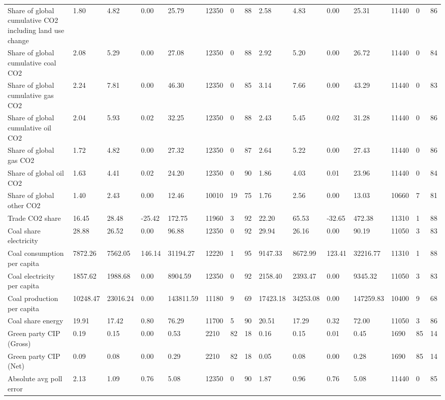 \begin{longtable}{lllllllllllllll}
Share of global cumulative CO2 including land use change & 1.80 & 4.82 & 0.00 & 25.79 & 12350 & 0 & 88 & 2.58 & 4.83 & 0.00 & 25.31 & 11440 & 0 & 86\\
Share of global cumulative coal CO2 & 2.08 & 5.29 & 0.00 & 27.08 & 12350 & 0 & 88 & 2.92 & 5.20 & 0.00 & 26.72 & 11440 & 0 & 84\\
Share of global cumulative gas CO2 & 2.24 & 7.81 & 0.00 & 46.30 & 12350 & 0 & 85 & 3.14 & 7.66 & 0.00 & 43.29 & 11440 & 0 & 83\\
Share of global cumulative oil CO2 & 2.04 & 5.93 & 0.02 & 32.25 & 12350 & 0 & 88 & 2.43 & 5.45 & 0.02 & 31.28 & 11440 & 0 & 86\\
\addlinespace
Share of global gas CO2 & 1.72 & 4.82 & 0.00 & 27.32 & 12350 & 0 & 87 & 2.64 & 5.22 & 0.00 & 27.43 & 11440 & 0 & 86\\
Share of global oil CO2 & 1.63 & 4.41 & 0.02 & 24.20 & 12350 & 0 & 90 & 1.86 & 4.03 & 0.01 & 23.96 & 11440 & 0 & 84\\
Share of global other CO2 & 1.40 & 2.43 & 0.00 & 12.46 & 10010 & 19 & 75 & 1.76 & 2.56 & 0.00 & 13.03 & 10660 & 7 & 81\\
Trade CO2 share & 16.45 & 28.48 & -25.42 & 172.75 & 11960 & 3 & 92 & 22.20 & 65.53 & -32.65 & 472.38 & 11310 & 1 & 88\\
Coal share electricity & 28.88 & 26.52 & 0.00 & 96.88 & 12350 & 0 & 92 & 29.94 & 26.16 & 0.00 & 90.19 & 11050 & 3 & 83\\
\addlinespace
Coal consumption per capita & 7872.26 & 7562.05 & 146.14 & 31194.27 & 12220 & 1 & 95 & 9147.33 & 8672.99 & 123.41 & 32216.77 & 11310 & 1 & 88\\
Coal electricity per capita & 1857.62 & 1988.68 & 0.00 & 8904.59 & 12350 & 0 & 92 & 2158.40 & 2393.47 & 0.00 & 9345.32 & 11050 & 3 & 83\\
Coal production per capita & 10248.47 & 23016.24 & 0.00 & 143811.59 & 11180 & 9 & 69 & 17423.18 & 34253.08 & 0.00 & 147259.83 & 10400 & 9 & 68\\
Coal share energy & 19.91 & 17.42 & 0.80 & 76.29 & 11700 & 5 & 90 & 20.51 & 17.29 & 0.32 & 72.00 & 11050 & 3 & 86\\
Green party CIP (Gross) & 0.19 & 0.15 & 0.00 & 0.53 & 2210 & 82 & 18 & 0.16 & 0.15 & 0.01 & 0.45 & 1690 & 85 & 14\\
\addlinespace
Green party CIP (Net) & 0.09 & 0.08 & 0.00 & 0.29 & 2210 & 82 & 18 & 0.05 & 0.08 & 0.00 & 0.28 & 1690 & 85 & 14\\
Absolute avg poll error & 2.13 & 1.09 & 0.76 & 5.08 & 12350 & 0 & 90 & 1.87 & 0.96 & 0.76 & 5.08 & 11440 & 0 & 85\\

\end{longtable}
